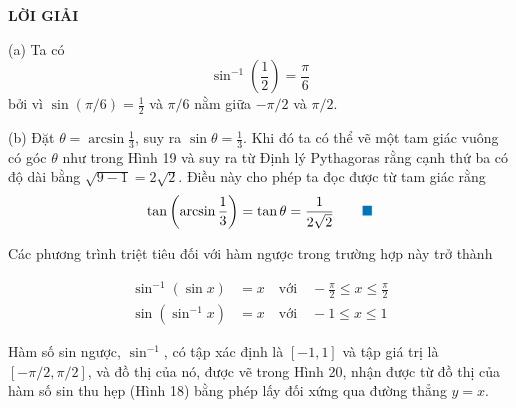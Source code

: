 \begin{minipage}[t]{0.71\textwidth}
    \vspace{0.12cm}
    \noindent
    \textbf{\textsf{\color{stewartcyan}LỜI GIẢI}}

    \noindent
    (a) Ta có
    \[
    \sin^{-1}\left(\frac{1}{2}\right) = \frac{\pi}{6}
    \]
    bởi vì $\sin(\pi/6) = \frac{1}{2}$ và $\pi/6$ nằm giữa $-\pi/2$ và $\pi/2$.

    \vspace{0.12cm}
    \noindent
    (b) Đặt $\theta = \arcsin\frac{1}{3}$, suy ra $\sin\theta = \frac{1}{3}$. Khi đó ta có thể vẽ một tam giác vuông có góc $\theta$ như trong Hình 19 và suy ra từ Định lý Pythagoras rằng cạnh thứ ba có độ dài bằng $\sqrt{9 - 1} = 2\sqrt{2}$. Điều này cho phép ta đọc được từ tam giác rằng
    \[
    \tan\left(\arcsin\frac{1}{3}\right) = \tan\theta = \frac{1}{2\sqrt{2}} \tag*{{\color{stewartcyan}$\blacksquare$}}
    \]

    Các phương trình triệt tiêu đối với hàm ngược trong trường hợp này trở thành

    \vspace{-0.2cm}
    \begin{center}
        \begin{tcolorbox}[colframe=stewartred, colback=white, sharp corners, boxrule=0.8pt, width=0.92\linewidth, halign=center, top=6pt, bottom=6pt]
            \begin{align*}
                \sin^{-1}(\sin x) &= x \quad \text{với} \quad -\frac{\pi}{2} \leqslant x \leqslant \frac{\pi}{2} \\[2mm]
                \sin(\sin^{-1}x) &= x \quad \text{với} \quad -1 \leqslant x \leqslant 1
            \end{align*}
        \end{tcolorbox}
    \end{center}

    \vspace{0.08cm}
    Hàm số sin ngược, $\sin^{-1}$, có tập xác định là $[-1, 1]$ và tập giá trị là $[-\pi/2, \pi/2]$, và đồ thị của nó, được vẽ trong Hình 20, nhận được từ đồ thị của hàm số sin thu hẹp (Hình 18) bằng phép lấy đối xứng qua đường thẳng $y = x$.
\end{minipage}